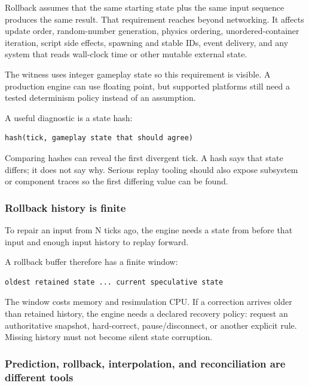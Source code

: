 Rollback assumes that the same starting state plus the same input sequence produces the same result. That requirement reaches beyond networking. It affects update order, random-number generation, physics ordering, unordered-container iteration, script side effects, spawning and stable IDs, event delivery, and any system that reads wall-clock time or other mutable external state.

The witness uses integer gameplay state so this requirement is visible. A production engine can use floating point, but supported platforms still need a tested determinism policy instead of an assumption.

A useful diagnostic is a state hash:

\begin{verbatim}
hash(tick, gameplay state that should agree)
\end{verbatim}

Comparing hashes can reveal the first divergent tick. A hash says that state differs; it does not say why. Serious replay tooling should also expose subsystem or component traces so the first differing value can be found.

\subsubsection{Rollback history is finite}\label{06-engine-ii-ch047-rollback-history-is-finite}

\hypertarget{06-engine-ii-ch047-rollback-history-is-finite}{}

To repair an input from N ticks ago, the engine needs a state from before that input and enough input history to replay forward.

A rollback buffer therefore has a finite window:

\begin{verbatim}
oldest retained state ... current speculative state
\end{verbatim}

The window costs memory and resimulation CPU. If a correction arrives older than retained history, the engine needs a declared recovery policy: request an authoritative snapshot, hard-correct, pause/disconnect, or another explicit rule. Missing history must not become silent state corruption.

\subsubsection{Prediction, rollback, interpolation, and reconciliation are different tools}\label{06-engine-ii-ch047-prediction-rollback-interpolation-and-reconciliation-are-different-tools}

